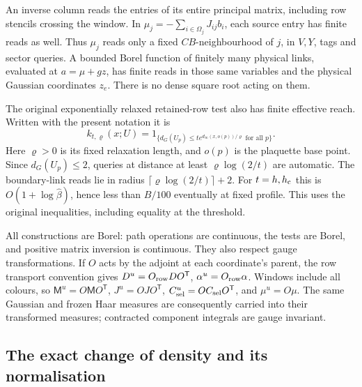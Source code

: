 \documentclass[11pt,reqno]{amsart}
\numberwithin{equation}{section}
\theoremstyle{definition}
\theoremstyle{remark}
\begin{document}
An inverse column reads the entries of its entire principal
matrix, including row stencils crossing the window. In
\(\mu_j=-\sum_{i\in\Omega_j}J_{ij}b_i\), each source entry
has finite reads as well. Thus \(\mu_j\) reads only a fixed
\(C B\)-neighbourhood of \(j\), in \(V,Y\), tags and sector
queries. A bounded Borel function of finitely many physical
links, evaluated at \(a=\mu+gz\), has finite reads in those
same variables and the physical Gaussian coordinates \(z_e\).
There is no dense square root acting on them.

The original exponentially relaxed retained-row test also has
finite effective reach. Written with the present notation it is
\[
 k_{t,\varrho}(x;U)=
 1_{\{d_G(U_p)\le t e^{d_\infty(x,o(p))/\varrho}\text{ for all }p\}}.
\]
Here \(\varrho>0\) is its fixed relaxation length, and \(o(p)\)
is the plaquette base point. Since \(d_G(U_p)\le2\), queries
at distance at least \(\varrho\log(2/t)\) are automatic.
The boundary-link reads lie in radius
\(\lceil\varrho\log(2/t)\rceil+2\). For \(t=h,h_{\rm c}\)
this is \(O(1+\log\widehat\beta)\), hence less than \(B/100\)
eventually at fixed profile. This uses the original inequalities,
including equality at the threshold.

All constructions are Borel: path operations are continuous,
the tests are Borel, and positive matrix inversion is continuous.
They also respect gauge transformations. If \(O\) acts by the
adjoint at each coordinate's parent, the row transport convention
gives \(D^u=O_{\rm row}DO^{\mathsf T}\), \(\alpha^u=O_{\rm row}\alpha\).
Windows include all colours, so
\(\mathsf M^u=O\mathsf MO^{\mathsf T}\), \(J^u=OJO^{\mathsf T}\),
\(C_{\rm sel}^u=OC_{\rm sel}O^{\mathsf T}\), and \(\mu^u=O\mu\).
The same Gaussian and frozen Haar measures are consequently
carried into their transformed measures; contracted component
integrals are gauge invariant.

\subsection{The exact change of density and its normalisation}
\end{document}
